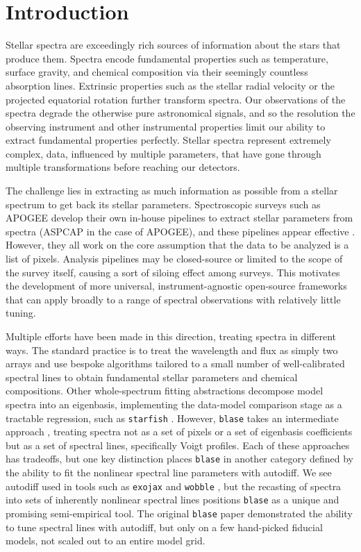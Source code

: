 \documentclass[twocolumn]{aastex631}
\begin{document}
\section{Introduction}
Stellar spectra are exceedingly rich sources of information about the stars that produce them. 
Spectra encode fundamental properties such as temperature, surface gravity, and chemical composition via their seemingly countless absorption lines. 
Extrinsic properties such as the stellar radial velocity or the projected equatorial rotation further transform spectra. 
Our observations of the spectra degrade the otherwise pure astronomical signals, and so the resolution the observing instrument and other instrumental properties limit our ability to extract fundamental properties perfectly. 
Stellar spectra represent extremely complex, data, influenced by multiple parameters, that have gone through multiple transformations before reaching our detectors.

The challenge lies in extracting as much information as possible from a stellar spectrum to get back its stellar parameters. 
Spectroscopic surveys such as APOGEE develop their own in-house pipelines to extract stellar parameters from spectra (ASPCAP in the case of APOGEE), and these pipelines appear effective \citep{APOGEE, ASPCAP}. 
However, they all work on the core assumption that the data to be analyzed is a list of pixels. 
Analysis pipelines may be closed-source or limited to the scope of the survey itself, causing a sort of siloing effect among surveys. 
This motivates the development of more universal, instrument-agnostic open-source frameworks that can apply broadly to a range of spectral observations with relatively little tuning.

Multiple efforts have been made in this direction, treating spectra in different ways. 
The standard practice is to treat the wavelength and flux as simply two arrays and use bespoke algorithms tailored to a small number of well-calibrated spectral lines to obtain fundamental stellar parameters and chemical compositions. 
Other whole-spectrum fitting abstractions decompose model spectra into an eigenbasis, implementing the data-model comparison stage as a tractable regression, such as \texttt{starfish} \citep{starfish}. 
However, \texttt{blase} takes an intermediate approach \citep{blase}, treating spectra not as a set of pixels or a set of eigenbasis coefficients but as a set of spectral lines, specifically Voigt profiles.
Each of these approaches has tradeoffs, but one key distinction places \texttt{blase} in another category defined by the ability to fit the nonlinear spectral line parameters with autodiff.
We see autodiff used in tools such as \texttt{exojax} and \texttt{wobble} \citep{exojax, wobble}, but the recasting of spectra into sets of inherently nonlinear spectral lines positions \texttt{blase} as a unique and promising semi-empirical tool.
The original \texttt{blase} paper demonstrated the ability to tune spectral lines with autodiff, but only on a few hand-picked fiducial models, not scaled out to an entire model grid.
\end{document}
